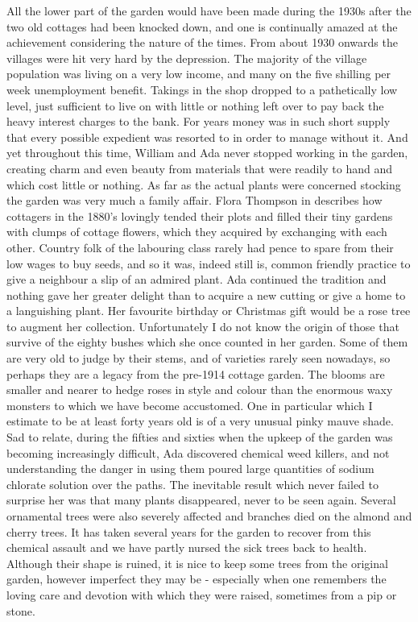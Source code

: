 All the lower part of the garden would have been made during the 1930s after the two old cottages had been knocked down, and one is continually amazed at the achievement considering the nature of the times. From about 1930 onwards the villages were hit very hard by the depression. The majority of the village population was living on a very low income, and many on the five shilling per week unemployment benefit. Takings in the shop dropped to a pathetically low level, just sufficient to live on with little or nothing left over to pay back the heavy interest charges to the bank. For years money was in such short supply that every possible expedient was resorted to in order to manage without it. And yet throughout this time, William and Ada never stopped working in the garden, creating charm and even beauty from materials that were readily to hand and which cost little or nothing. As far as the actual plants were concerned stocking the garden was very much a family affair. Flora Thompson in  describes how cottagers in the 1880's lovingly tended their plots and filled their tiny gardens with clumps of cottage flowers, which they acquired by exchanging with each other. Country folk of the labouring class rarely had pence to spare from their low wages to buy seeds, and so it was, indeed still is, common friendly practice to give a neighbour a slip of an admired plant. Ada continued the tradition and nothing gave her greater delight than to acquire a new cutting or give a home to a languishing plant. Her favourite birthday or Christmas gift would be a rose tree to augment her collection. Unfortunately I do not know the origin of those that survive of the eighty bushes which she once counted in her garden. Some of them are very old to judge by their stems, and of varieties rarely seen nowadays, so perhaps they are a legacy from the pre-1914 cottage garden. The blooms are smaller and nearer to hedge roses in style and colour than the enormous waxy monsters to which we have become accustomed. One in particular which I estimate to be at least forty years old is of a very unusual pinky mauve shade. Sad to relate, during the fifties and sixties when the upkeep of the garden was becoming increasingly difficult, Ada discovered chemical weed killers, and not understanding the danger in using them poured large quantities of sodium chlorate solution over the paths. The inevitable result which never failed to surprise her was that many plants disappeared, never to be seen again. Several ornamental trees were also severely affected and branches died on the almond and cherry trees. It has taken several years for the garden to recover from this chemical assault and we have partly nursed the sick trees back to health. Although their shape is ruined, it is nice to keep some trees from the original garden, however imperfect they may be - especially when one remembers the loving care and devotion with which they were raised, sometimes from a pip or stone.

